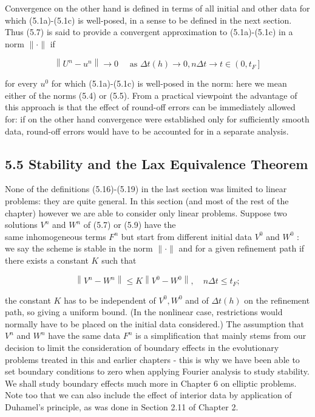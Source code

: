 \documentclass[10pt]{article}
\begin{document}
Convergence on the other hand is defined in terms of all initial and other data for which (5.1a)-(5.1c) is well-posed, in a sense to be defined in the next section. Thus (5.7) is said to provide a convergent approximation to (5.1a)-(5.1c) in a norm \(\|\cdot\|\) if

\[
\left\|U^{n}-u^{n}\right\| \rightarrow 0 \quad \text { as } \Delta t(h) \rightarrow 0, n \Delta t \rightarrow t \in\left(0, t_{F}\right]
\]

for every \(u^{0}\) for which (5.1a)-(5.1c) is well-posed in the norm: here we mean either of the norms (5.4) or (5.5). From a practical viewpoint the advantage of this approach is that the effect of round-off errors can be immediately allowed for: if on the other hand convergence were established only for sufficiently smooth data, round-off errors would have to be accounted for in a separate analysis.

\subsection*{5.5 Stability and the Lax Equivalence Theorem}
None of the definitions (5.16)-(5.19) in the last section was limited to linear problems: they are quite general. In this section (and most of the rest of the chapter) however we are able to consider only linear problems. Suppose two solutions \(V^{n}\) and \(W^{n}\) of (5.7) or (5.9) have the\\
same inhomogeneous terms \(F^{n}\) but start from different initial data \(V^{0}\) and \(W^{0}\) : we say the scheme is stable in the norm \(\|\cdot\|\) and for a given refinement path if there exists a constant \(K\) such that

\[
\left\|V^{n}-W^{n}\right\| \leq K\left\|V^{0}-W^{0}\right\|, \quad n \Delta t \leq t_{F} ;
\]

the constant \(K\) has to be independent of \(V^{0}, W^{0}\) and of \(\Delta t(h)\) on the refinement path, so giving a uniform bound. (In the nonlinear case, restrictions would normally have to be placed on the initial data considered.) The assumption that \(V^{n}\) and \(W^{n}\) have the same data \(F^{n}\) is a simplification that mainly stems from our decision to limit the consideration of boundary effects in the evolutionary problems treated in this and earlier chapters - this is why we have been able to set boundary conditions to zero when applying Fourier analysis to study stability. We shall study boundary effects much more in Chapter 6 on elliptic problems. Note too that we can also include the effect of interior data by application of Duhamel's principle, as was done in Section 2.11 of Chapter 2.
\end{document}
